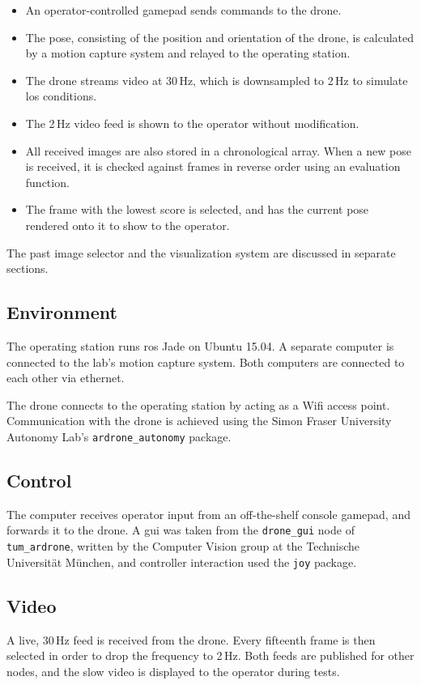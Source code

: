   \begin{itemize}
    \item An operator-controlled gamepad sends commands to the drone.
    \item The pose, consisting of the position and orientation of the drone, is calculated by a motion capture system and relayed to the operating station.
    \item The drone streams video at 30\,Hz, which is downsampled to 2\,Hz to simulate \gls{los} conditions.
    \item The 2\,Hz video feed is shown to the operator without modification.
    \item All received images are also stored in a chronological array.
	  When a new pose is received, it is checked against frames in reverse order using an evaluation function.
    \item The frame with the lowest score is selected, and has the current pose rendered onto it to show to the operator.
  \end{itemize}

  The past image selector and the visualization system are discussed in separate sections.

  \subsection{Environment}
    The operating station runs \gls{ros} Jade on Ubuntu 15.04.
    A separate computer is connected to the lab's motion capture system.
    Both computers are connected to each other via ethernet.

    The drone connects to the operating station by acting as a Wifi access point.
    Communication with the drone is achieved using the Simon Fraser University Autonomy Lab's \verb|ardrone_autonomy| package.

  \subsection{Control}
    The computer receives operator input from an off-the-shelf console gamepad, and forwards it to the drone.
    A \gls{gui} was taken from the \verb|drone_gui| node of \verb|tum_ardrone|, written by the Computer Vision group at the Technische Universität München, and controller interaction used the \verb|joy| package.

  \subsection{Video}
    A live, 30\,Hz feed is received from the drone.
    Every fifteenth frame is then selected in order to drop the frequency to 2\,Hz.
    Both feeds are published for other nodes, and the slow video is displayed to the operator during tests.

